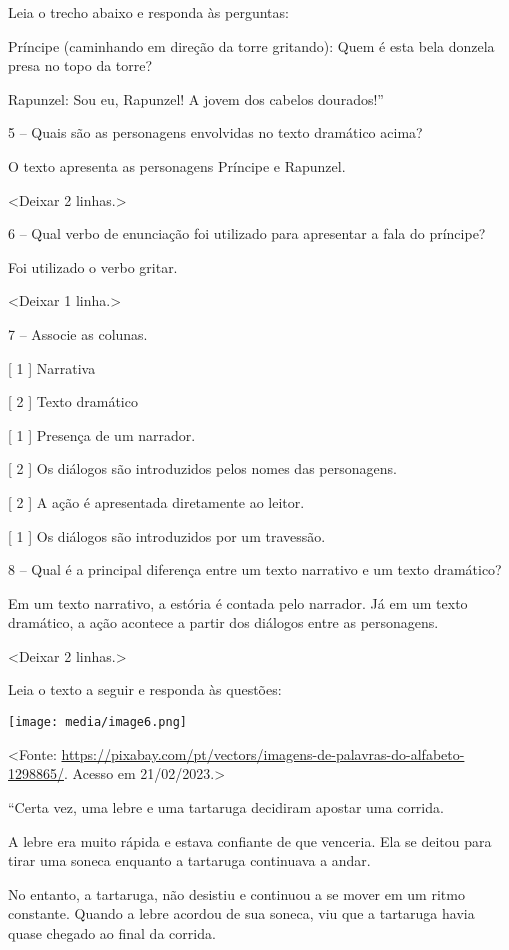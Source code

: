 Leia o trecho abaixo e responda às perguntas:

Príncipe (caminhando em direção da torre gritando): Quem é esta bela
donzela presa no topo da torre?

Rapunzel: Sou eu, Rapunzel! A jovem dos cabelos dourados!''

5 -- Quais são as personagens envolvidas no texto dramático acima?

O texto apresenta as personagens Príncipe e Rapunzel.

\textless{}Deixar 2 linhas.\textgreater{}

6 -- Qual verbo de enunciação foi utilizado para apresentar a fala do
príncipe?

Foi utilizado o verbo gritar.

\textless{}Deixar 1 linha.\textgreater{}

7 -- Associe as colunas.

{[} 1 {]} Narrativa

{[} 2 {]} Texto dramático

{[} 1 {]} Presença de um narrador.

{[} 2 {]} Os diálogos são introduzidos pelos nomes das personagens.

{[} 2 {]} A ação é apresentada diretamente ao leitor.

{[} 1 {]} Os diálogos são introduzidos por um travessão.

8 -- Qual é a principal diferença entre um texto narrativo e um texto
dramático?

Em um texto narrativo, a estória é contada pelo narrador. Já em um texto
dramático, a ação acontece a partir dos diálogos entre as personagens.

\textless{}Deixar 2 linhas.\textgreater{}

Leia o texto a seguir e responda às questões:

\texttt{[image: media/image6.png]}

\textless{}Fonte:
\url{https://pixabay.com/pt/vectors/imagens-de-palavras-do-alfabeto-1298865/}.
Acesso em 21/02/2023.\textgreater{}

``Certa vez, uma lebre e uma tartaruga decidiram apostar uma corrida.

A lebre era muito rápida e estava confiante de que venceria. Ela se
deitou para tirar uma soneca enquanto a tartaruga continuava a andar.

No entanto, a tartaruga, não desistiu e continuou a se mover em um ritmo
constante. Quando a lebre acordou de sua soneca, viu que a tartaruga
havia quase chegado ao final da corrida.


